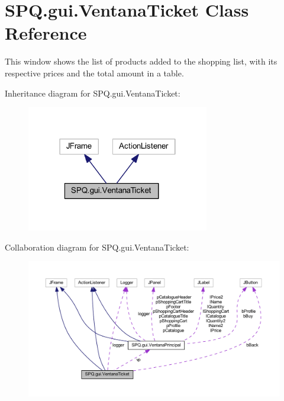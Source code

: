 \hypertarget{class_s_p_q_1_1gui_1_1_ventana_ticket}{}\section{S\+P\+Q.\+gui.\+Ventana\+Ticket Class Reference}
\label{class_s_p_q_1_1gui_1_1_ventana_ticket}


This window shows the list of products added to the shopping list, with its respective prices and the total amount in a table.  




Inheritance diagram for S\+P\+Q.\+gui.\+Ventana\+Ticket\+:
\nopagebreak
\begin{figure}[H]
\begin{center}
\leavevmode
\includegraphics[width=226pt]{class_s_p_q_1_1gui_1_1_ventana_ticket__inherit__graph}
\end{center}
\end{figure}


Collaboration diagram for S\+P\+Q.\+gui.\+Ventana\+Ticket\+:
\nopagebreak
\begin{figure}[H]
\begin{center}
\leavevmode
\includegraphics[width=350pt]{class_s_p_q_1_1gui_1_1_ventana_ticket__coll__graph}
\end{center}
\end{figure}
